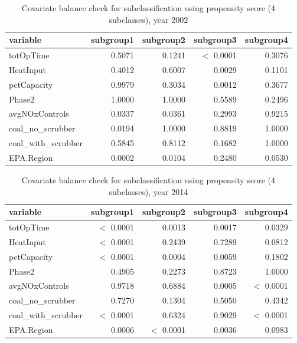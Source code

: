 \documentclass[11pt,letter]{article}
\begin{document}
\begin{enumerate}[(a)]
  \begin{table}[ht]
    \centering
    \begin{tabular}{lrrrr}
      \toprule
      variable             & subgroup1 & subgroup2 & subgroup3  & subgroup4 \\ 
      \midrule
      totOpTime            & 0.5071    & 0.1241    & $<$ 0.0001 & 0.3076    \\ 
      HeatInput            & 0.4012    & 0.6007    & 0.0029     & 0.1101    \\ 
      pctCapacity          & 0.9979    & 0.3034    & 0.0012     & 0.3677    \\ 
      Phase2               & 1.0000    & 1.0000    & 0.5589     & 0.2496    \\ 
      avgNOxControls       & 0.0337    & 0.0361    & 0.2993     & 0.9215    \\ 
      coal\_no\_scrubber   & 0.0194    & 1.0000    & 0.8819     & 1.0000    \\ 
      coal\_with\_scrubber & 0.5845    & 0.8112    & 0.1682     & 1.0000        \\ 
      EPA.Region           & 0.0002    & 0.0104    & 0.2480     & 0.0530    \\ 
      \bottomrule
    \end{tabular}
    \caption{Covariate balance check for subclassification using propensity score (4 subclasses), year 2002} 
    \label{tab-bal2d-02}
  \end{table}

  \begin{table}[ht]
    \centering
    \begin{tabular}{lrrrr}
      \toprule
      variable & subgroup1 & subgroup2 & subgroup3 & subgroup4 \\ 
      \midrule
      totOpTime & $<$ 0.0001 & 0.0013 & 0.0017 & 0.0329 \\ 
      HeatInput & $<$ 0.0001 & 0.2439 & 0.7289 & 0.0812 \\ 
      pctCapacity & $<$ 0.0001 & 0.0004 & 0.0059 & 0.1802 \\ 
      Phase2 & 0.4905 & 0.2273 & 0.8723 & 1.0000 \\ 
      avgNOxControls & 0.9718 & 0.6884 & 0.0005 & $<$ 0.0001 \\ 
      coal\_no\_scrubber & 0.7270 & 0.1304 & 0.5050 & 0.4342 \\ 
      coal\_with\_scrubber & $<$ 0.0001 & 0.6324 & 0.9029 & $<$ 0.0001 \\ 
      EPA.Region & 0.0006 & $<$ 0.0001 & 0.0036 & 0.0983 \\ 
      \bottomrule
    \end{tabular}
    \caption{Covariate balance check for subclassification using propensity score (4 subclasses), year 2014} 
    \label{tab-bal2d-14}
  \end{table}


\end{enumerate}
\end{document}
